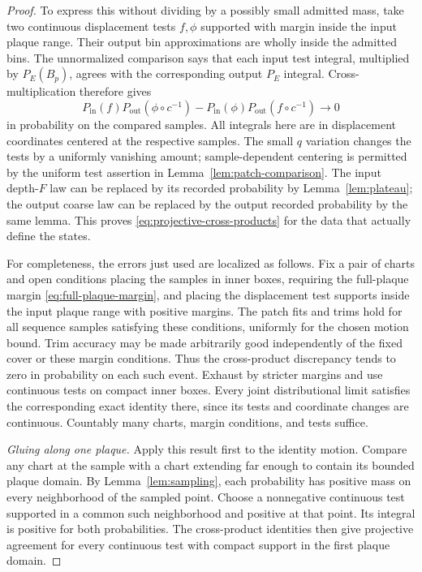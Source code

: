 \begin{proof}
To express this without dividing by a possibly small admitted
mass, take two continuous displacement tests $f,\phi$ supported
with margin inside the input plaque range. Their output bin
approximations are wholly inside the admitted bins. The
unnormalized comparison says that each input test integral,
multiplied by $P_E(B_p)$, agrees with the corresponding output
$P_E$ integral. Cross-multiplication therefore gives
\begin{equation}\label{eq:projective-cross-products}
 P_{\mathrm{in}}(f)P_{\mathrm{out}}(\phi\circ c^{-1})
 -P_{\mathrm{in}}(\phi)P_{\mathrm{out}}(f\circ c^{-1})
 \longrightarrow0
\end{equation}
in probability on the compared samples. All integrals here are in
displacement coordinates centered at the respective samples.
The small $q$ variation changes the tests by a uniformly vanishing
amount; sample-dependent centering is permitted by the uniform
test assertion in Lemma~\ref{lem:patch-comparison}. The input
depth-$F$ law can be replaced by its recorded probability by
Lemma~\ref{lem:plateau}; the output coarse law can be replaced by
the output recorded probability by the same lemma. This proves
\eqref{eq:projective-cross-products} for the data that actually
define the states.

For completeness, the errors just used are localized as follows.
Fix a pair of charts and open conditions placing the samples in
inner boxes, requiring the full-plaque margin
\eqref{eq:full-plaque-margin}, and placing the displacement test
supports inside the input plaque range with positive margins.
The patch fits and trims hold for all sequence samples satisfying
these conditions, uniformly for
the chosen motion bound. Trim accuracy may be made arbitrarily
good independently of the fixed cover or these margin conditions.
Thus the cross-product discrepancy tends to zero in probability
on each such event. Exhaust by stricter margins and use continuous
tests on compact inner boxes. Every joint distributional limit
satisfies the corresponding exact identity there, since its tests
and coordinate changes are continuous. Countably many charts,
margin conditions, and tests suffice.

\smallskip\noindent
\emph{Gluing along one plaque.}
Apply this result first to the identity motion. Compare any chart
at the sample with a chart extending far enough to contain its
bounded plaque domain. By Lemma~\ref{lem:sampling}, each probability
has positive mass on every neighborhood of the sampled point.
Choose a nonnegative continuous test supported in a common such
neighborhood and positive at that point. Its integral is positive
for both probabilities. The cross-product identities then give
projective agreement for every continuous test with compact support
in the first plaque domain.


\end{proof}
